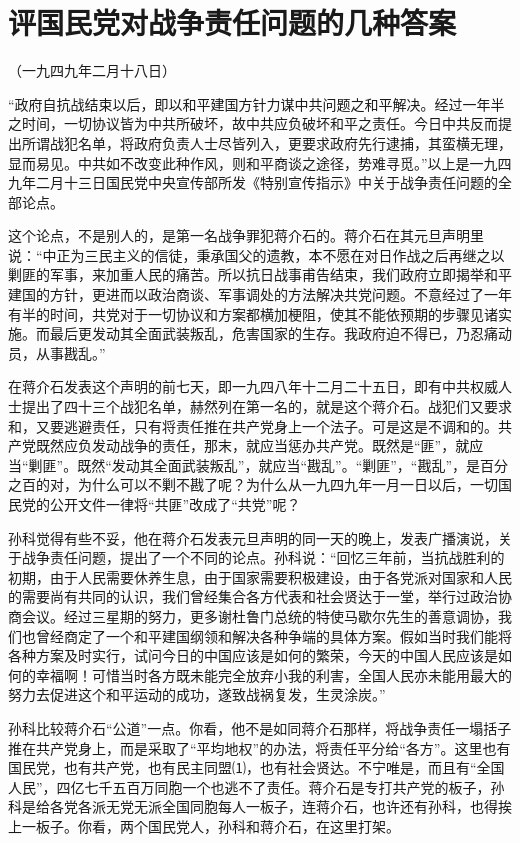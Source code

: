 \documentclass[UTF-8, a5paper, 12pt]{ctexart}
\begin{document}
\section{评国民党对战争责任问题的几种答案}

（一九四九年二月十八日）

“政府自抗战结束以后，即以和平建国方针力谋中共问题之和平解决。经过一年半之时间，一切协议皆为中共所破坏，故中共应负破坏和平之责任。今日中共反而提出所谓战犯名单，将政府负责人士尽皆列入，更要求政府先行逮捕，其蛮横无理，显而易见。中共如不改变此种作风，则和平商谈之途径，势难寻觅。”以上是一九四九年二月十三日国民党中央宣传部所发《特别宣传指示》中关于战争责任问题的全部论点。

这个论点，不是别人的，是第一名战争罪犯蒋介石的。蒋介石在其元旦声明里说：“中正为三民主义的信徒，秉承国父的遗教，本不愿在对日作战之后再继之以剿匪的军事，来加重人民的痛苦。所以抗日战事甫告结束，我们政府立即揭举和平建国的方针，更进而以政治商谈、军事调处的方法解决共党问题。不意经过了一年有半的时间，共党对于一切协议和方案都横加梗阻，使其不能依预期的步骤见诸实施。而最后更发动其全面武装叛乱，危害国家的生存。我政府迫不得已，乃忍痛动员，从事戡乱。”

在蒋介石发表这个声明的前七天，即一九四八年十二月二十五日，即有中共权威人士提出了四十三个战犯名单，赫然列在第一名的，就是这个蒋介石。战犯们又要求和，又要逃避责任，只有将责任推在共产党身上一个法子。可是这是不调和的。共产党既然应负发动战争的责任，那末，就应当惩办共产党。既然是“匪”，就应当“剿匪”。既然“发动其全面武装叛乱”，就应当“戡乱”。“剿匪”，“戡乱”，是百分之百的对，为什么可以不剿不戡了呢？为什么从一九四九年一月一日以后，一切国民党的公开文件一律将“共匪”改成了“共党”呢？

孙科觉得有些不妥，他在蒋介石发表元旦声明的同一天的晚上，发表广播演说，关于战争责任问题，提出了一个不同的论点。孙科说：“回忆三年前，当抗战胜利的初期，由于人民需要休养生息，由于国家需要积极建设，由于各党派对国家和人民的需要尚有共同的认识，我们曾经集合各方代表和社会贤达于一堂，举行过政治协商会议。经过三星期的努力，更多谢杜鲁门总统的特使马歇尔先生的善意调协，我们也曾经商定了一个和平建国纲领和解决各种争端的具体方案。假如当时我们能将各种方案及时实行，试问今日的中国应该是如何的繁荣，今天的中国人民应该是如何的幸福啊！可惜当时各方既未能完全放弃小我的利害，全国人民亦未能用最大的努力去促进这个和平运动的成功，遂致战祸复发，生灵涂炭。”

孙科比较蒋介石“公道”一点。你看，他不是如同蒋介石那样，将战争责任一塌括子推在共产党身上，而是采取了“平均地权”的办法，将责任平分给“各方”。这里也有国民党，也有共产党，也有民主同盟⑴，也有社会贤达。不宁唯是，而且有“全国人民”，四亿七千五百万同胞一个也逃不了责任。蒋介石是专打共产党的板子，孙科是给各党各派无党无派全国同胞每人一板子，连蒋介石，也许还有孙科，也得挨上一板子。你看，两个国民党人，孙科和蒋介石，在这里打架。
\end{document}
